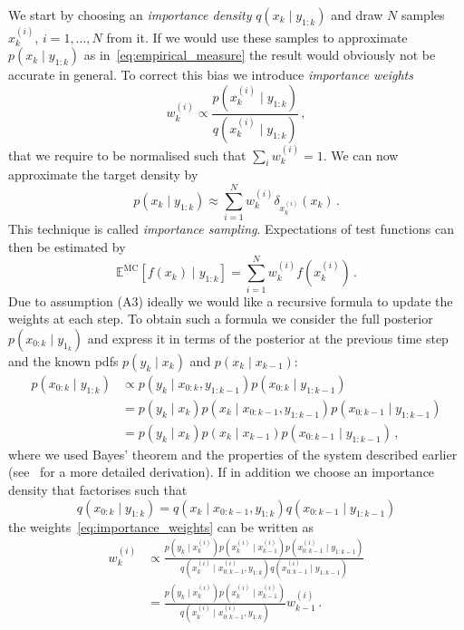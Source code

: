 We start by choosing an \emph{importance density}
$q(x_k \mid y_{1:k})$ and draw $N$ samples $x^{(i)}_k$,
$i = 1, \dotsc, N$ from it. If we would use these samples to
approximate $p(x_k \mid y_{1:k})$ as in~\eqref{eq:empirical_measure}
the result would obviously not be accurate in general. To correct this
bias we introduce \emph{importance weights}
\begin{equation}
  \label{eq:importance_weights}
  w_k^{(i)} \propto \frac{p(x_k^{(i)} \mid y_{1:k})}{q(x_k^{(i)} \mid
    y_{1:k})} \,,
\end{equation}
that we require to be normalised such that $\sum_i w_k^{(i)} = 1$. We
can now approximate the target density by
\begin{equation}
  \label{eq:karget:approx}
  p(x_k \mid y_{1:k}) \approx \sum_{i=1}^N w_k^{(i)} \delta_{x_k^{(i)}}(x_k) \,.
\end{equation}
This technique is called \emph{importance sampling}. Expectations of
test functions can then be estimated by
\[
  \mathbb{E}^{\text{MC}}[f(x_k) \mid y_{1:k}] = \sum_{i=1}^N
  w_k^{(i)}f(x_k^{(i)}) \,.
\]
Due to assumption (A3) ideally we would like a recursive formula to
update the weights at each step. To obtain such a formula we consider
the full posterior $p(x_{0:k} \mid y_{1_k})$ and express it in terms
of the posterior at the previous time step and the known pdfs
$p(y_k \mid x_k)$ and $p(x_k \mid x_{k-1})$:
\begin{align*}
  p(x_{0:k} \mid y_{1:k}) &\propto p(y_k \mid x_{0:k}, y_{1:k-1}) p(x_{0:k} \mid y_{1:k-1}) \\
                          &= p(y_k \mid x_k) p(x_k \mid x_{0:k-1}, y_{1:k-1}) p(x_{0:k-1} \mid y_{1:k-1}) \\
                          &= p(y_k \mid x_k) p(x_k \mid x_{k-1}) p(x_{0:k-1} \mid y_{1:k-1})\,,
\end{align*}
where we used Bayes' theorem and the properties of the system
described earlier (see~\cite{arulampalam} for a more detailed
derivation). If in addition we choose an importance density that
factorises such that
\[
  q(x_{0:k} \mid y_{1:k}) = q(x_k \mid x_{0:k-1}, y_{1:k}) q(x_{0:k-1}
  \mid y_{1:k-1})
\]
the weights~\eqref{eq:importance_weights} can be written as
\begin{align*}
  w_k^{(i)} &\propto \frac{p(y_k \mid x_k^{(i)}) p(x_k^{(i)} \mid x_{k-1}^{(i)}) p(x_{0:k-1}^{(i)} \mid y_{1:k-1})}{q(x_k^{(i)} \mid x_{0:k-1}^{(i)}, y_{1:k}) q(x_{0:k-1}^{(i)} \mid y_{1:k-1})} \\
            &= \frac{p(y_k \mid x_k^{(i)}) p(x_k^{(i)} \mid x_{k-1}^{(i)})}{q(x_k^{(i)} \mid x_{0:k-1}^{(i)}, y_{1:k})} w^{(i)}_{k-1} \,.
\end{align*}
